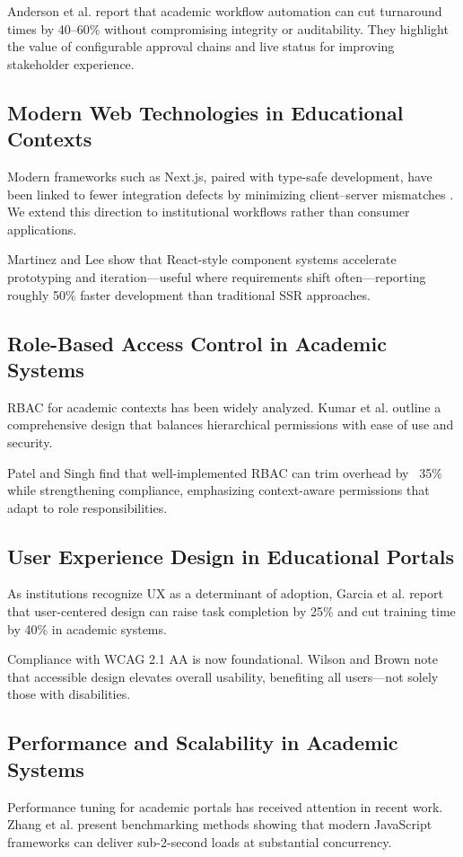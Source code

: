 \documentclass[conference]{IEEEtran}
\begin{document}
Anderson et al. \cite{anderson2023workflow} report that academic workflow automation can cut turnaround times by 40–60\% without compromising integrity or auditability. They highlight the value of configurable approval chains and live status for improving stakeholder experience.

\subsection{Modern Web Technologies in Educational Contexts}
Modern frameworks such as Next.js, paired with type-safe development, have been linked to fewer integration defects by minimizing client–server mismatches \cite{nextjs2024, typescript2024}. We extend this direction to institutional workflows rather than consumer applications.

Martinez and Lee \cite{martinez2023modern} show that React-style component systems accelerate prototyping and iteration—useful where requirements shift often—reporting roughly 50\% faster development than traditional SSR approaches.

\subsection{Role-Based Access Control in Academic Systems}
RBAC for academic contexts has been widely analyzed. Kumar et al. \cite{kumar2022rbac} outline a comprehensive design that balances hierarchical permissions with ease of use and security.

Patel and Singh \cite{patel2023academic} find that well-implemented RBAC can trim overhead by ~35\% while strengthening compliance, emphasizing context-aware permissions that adapt to role responsibilities.

\subsection{User Experience Design in Educational Portals}
As institutions recognize UX as a determinant of adoption, Garcia et al. \cite{garcia2023ux} report that user-centered design can raise task completion by 25\% and cut training time by 40\% in academic systems.

Compliance with WCAG 2.1 AA is now foundational. Wilson and Brown \cite{wilson2023accessibility} note that accessible design elevates overall usability, benefiting all users—not solely those with disabilities.

\subsection{Performance and Scalability in Academic Systems}
Performance tuning for academic portals has received attention in recent work. Zhang et al. \cite{zhang2023performance} present benchmarking methods showing that modern JavaScript frameworks can deliver sub-2-second loads at substantial concurrency.
\end{document}
